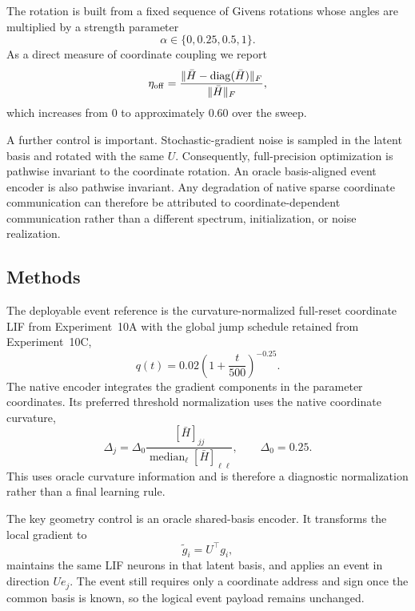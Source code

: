 The rotation is built from a fixed sequence of Givens rotations whose angles are multiplied by a strength parameter
\begin{equation}
  \alpha\in\{0,0.25,0.5,1\}.
\end{equation}
As a direct measure of coordinate coupling we report
\begin{equation}
  \eta_{\rm off}
  =
  \frac{\|\bar H-\operatorname{diag}(\bar H)\|_F}{\|\bar H\|_F},
\end{equation}
which increases from $0$ to approximately $0.60$ over the sweep.

A further control is important. Stochastic-gradient noise is sampled in the latent basis and rotated with the same $U$. Consequently, full-precision optimization is pathwise invariant to the coordinate rotation. An oracle basis-aligned event encoder is also pathwise invariant. Any degradation of native sparse coordinate communication can therefore be attributed to coordinate-dependent communication rather than a different spectrum, initialization, or noise realization.

\subsection{Methods}

The deployable event reference is the curvature-normalized full-reset coordinate LIF from Experiment~10A with the global jump schedule retained from Experiment~10C,
\begin{equation}
  q(t)=0.02\left(1+\frac{t}{500}\right)^{-0.25}.
\end{equation}
The native encoder integrates the gradient components in the parameter coordinates. Its preferred threshold normalization uses the native coordinate curvature,
\begin{equation}
  \Delta_j
  =\Delta_0
  \frac{[\bar H]_{jj}}{\operatorname{median}_\ell [\bar H]_{\ell\ell}},
  \qquad \Delta_0=0.25.
\end{equation}
This uses oracle curvature information and is therefore a diagnostic normalization rather than a final learning rule.

The key geometry control is an oracle shared-basis encoder. It transforms the local gradient to
\begin{equation}
  \widetilde g_i=U^\top g_i,
\end{equation}
maintains the same LIF neurons in that latent basis, and applies an event in direction $Ue_j$. The event still requires only a coordinate address and sign once the common basis is known, so the logical event payload remains unchanged.

